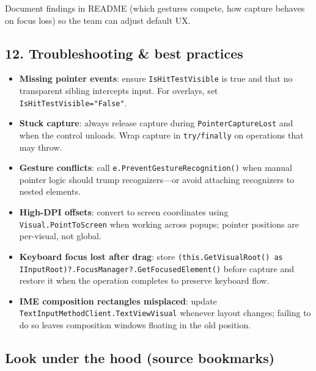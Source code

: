 Document findings in README (which gestures compete, how capture behaves
on focus loss) so the team can adjust default UX.

\subsection{12. Troubleshooting \& best
practices}\label{troubleshooting-best-practices-2}

\begin{itemize}
\tightlist
\item
  \textbf{Missing pointer events}: ensure
  \passthrough{\lstinline!IsHitTestVisible!} is true and that no
  transparent sibling intercepts input. For overlays, set
  \passthrough{\lstinline!IsHitTestVisible="False"!}.
\item
  \textbf{Stuck capture}: always release capture during
  \passthrough{\lstinline!PointerCaptureLost!} and when the control
  unloads. Wrap capture in \passthrough{\lstinline!try/finally!} on
  operations that may throw.
\item
  \textbf{Gesture conflicts}: call
  \passthrough{\lstinline!e.PreventGestureRecognition()!} when manual
  pointer logic should trump recognizers---or avoid attaching
  recognizers to nested elements.
\item
  \textbf{High-DPI offsets}: convert to screen coordinates using
  \passthrough{\lstinline!Visual.PointToScreen!} when working across
  popups; pointer positions are per-visual, not global.
\item
  \textbf{Keyboard focus lost after drag}: store
  \passthrough{\lstinline!(this.GetVisualRoot() as IInputRoot)?.FocusManager?.GetFocusedElement()!}
  before capture and restore it when the operation completes to preserve
  keyboard flow.
\item
  \textbf{IME composition rectangles misplaced}: update
  \passthrough{\lstinline!TextInputMethodClient.TextViewVisual!}
  whenever layout changes; failing to do so leaves composition windows
  floating in the old position.
\end{itemize}

\subsection{Look under the hood (source
bookmarks)}\label{look-under-the-hood-source-bookmarks-25}

